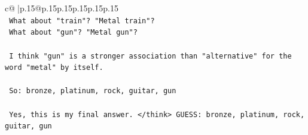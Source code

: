 \documentclass{article}
\begin{document}
{\begin{supertabular}{c@{$\;$}|p{.15\linewidth}@{}p{.15\linewidth}p{.15\linewidth}p{.15\linewidth}p{.15\linewidth}p{.15\linewidth}}
{{{\\ 
\texttt{ What about "train"? "Metal train"?} \\
\texttt{ What about "gun"? "Metal gun"?} \\
\\ 
\texttt{ I think "gun" is a stronger association than "alternative" for the word "metal" by itself.} \\
\\ 
\texttt{ So: bronze, platinum, rock, guitar, gun} \\
\\ 
\texttt{ Yes, this is my final answer. </think> GUESS: bronze, platinum, rock, guitar, gun} \\
            }
        }
    }
     \\ \\


\end{supertabular}}
\end{document}
